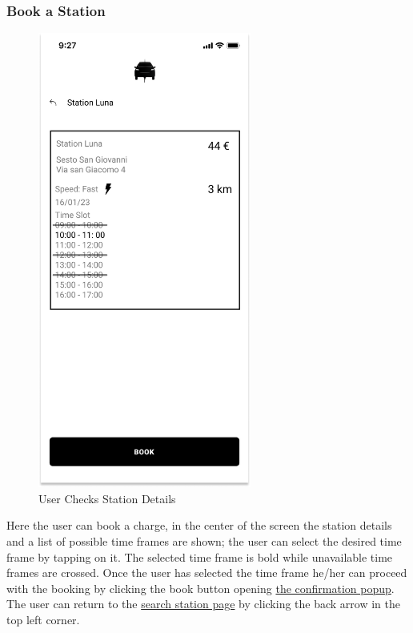 \subsubsection{Book a Station}
\begin{figure}[H]
    \centering
    \includegraphics[keepaspectratio, height=15cm]{AppInterface/Station Details.png}
    \caption{User Checks Station Details}
    \label{fig:StationDetails}
\end{figure}
Here the user can book a charge, in the center of the screen the station details and a list of possible time frames are shown; the user can select the desired time frame by tapping on it. The selected time frame is bold while unavailable time frames are crossed. Once the user has selected the time frame he/her can proceed with the booking by clicking the book button opening \hyperref[pop:Booking]{the confirmation popup}. The user can return to the \hyperref[fig:Search]{search station page} by clicking the back arrow in the top left corner.
